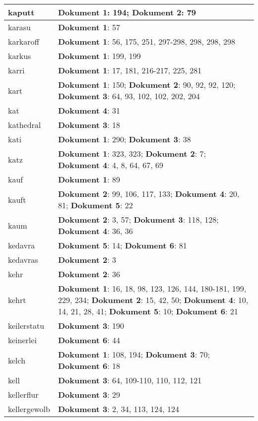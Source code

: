 \documentclass[a5paper]{article}
\begin{document}
\begin{longtable}[l]{|l|p{3in}|}
\hline
kaputt & \textbf{Dokument 1}: 194; \textbf{Dokument 2}: 79 \\
\hline
karasu & \textbf{Dokument 1}: 57 \\
\hline
karkaroff & \textbf{Dokument 1}: 56, 175, 251, 297-298, 298, 298, 298 \\
\hline
karkus & \textbf{Dokument 1}: 199, 199 \\
\hline
karri & \textbf{Dokument 1}: 17, 181, 216-217, 225, 281 \\
\hline
kart & \textbf{Dokument 1}: 150; \textbf{Dokument 2}: 90, 92, 92, 120; \textbf{Dokument 3}: 64, 93, 102, 102, 202, 204 \\
\hline
kat & \textbf{Dokument 4}: 31 \\
\hline
kathedral & \textbf{Dokument 3}: 18 \\
\hline
kati & \textbf{Dokument 1}: 290; \textbf{Dokument 3}: 38 \\
\hline
katz & \textbf{Dokument 1}: 323, 323; \textbf{Dokument 2}: 7; \textbf{Dokument 4}: 4, 8, 64, 67, 69 \\
\hline
kauf & \textbf{Dokument 1}: 89 \\
\hline
kauft & \textbf{Dokument 2}: 99, 106, 117, 133; \textbf{Dokument 4}: 20, 81; \textbf{Dokument 5}: 22 \\
\hline
kaum & \textbf{Dokument 2}: 3, 57; \textbf{Dokument 3}: 118, 128; \textbf{Dokument 4}: 36, 36 \\
\hline
kedavra & \textbf{Dokument 5}: 14; \textbf{Dokument 6}: 81 \\
\hline
kedavras & \textbf{Dokument 2}: 3 \\
\hline
kehr & \textbf{Dokument 2}: 36 \\
\hline
kehrt & \textbf{Dokument 1}: 16, 18, 98, 123, 126, 144, 180-181, 199, 229, 234; \textbf{Dokument 2}: 15, 42, 50; \textbf{Dokument 4}: 10, 14, 21, 28, 41; \textbf{Dokument 5}: 10; \textbf{Dokument 6}: 21 \\
\hline
keilerstatu & \textbf{Dokument 3}: 190 \\
\hline
keinerlei & \textbf{Dokument 6}: 44 \\
\hline
kelch & \textbf{Dokument 1}: 108, 194; \textbf{Dokument 3}: 70; \textbf{Dokument 6}: 18 \\
\hline
kell & \textbf{Dokument 3}: 64, 109-110, 110, 112, 121 \\
\hline
kellerflur & \textbf{Dokument 3}: 29 \\
\hline
kellergewolb & \textbf{Dokument 3}: 2, 34, 113, 124, 124 \\

\end{longtable}
\end{document}
